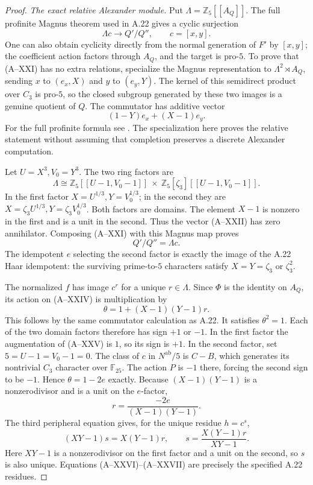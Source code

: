 \begin{proof}
\emph{The exact relative Alexander module.}
Put $\Lambda=\mathbb Z_5[[A_Q]]$. The full profinite
Magnus theorem used in A.22 gives a cyclic
surjection
\[
       \Lambda c\longrightarrow Q'/Q'',\qquad c=[x,y].          \tag{A--XXI}
\]
One can also obtain cyclicity directly from the
normal generation of $F'$ by $[x,y]$; the coefficient
action factors through $A_Q$, and the target is
pro-$5$. To prove that (A--XXI) has no extra
relations, specialize the Magnus representation
to $\Lambda^2\rtimes A_Q$, sending
$x$ to $(e_x,X)$ and $y$ to $(e_y,Y)$.
The kernel of this semidirect product over $C_3$
is pro-$5$, so the closed subgroup generated by
these two images is a genuine quotient of $Q$.
The commutator has additive vector
\[
                    (1-Y)e_x+(X-1)e_y.                          \tag{A--XXII}
\]
For the full profinite formula see
\citet[Propositions 3.2.1 and 4.1.1(b), Corollary 4.1.5]{A_ChenDeligne2017}.
The specialization here proves the relative
statement without assuming that completion
preserves a discrete Alexander computation.

Let $U=X^3,V_0=Y^3$. The two ring factors are
\[
 \Lambda\cong
 \mathbb Z_5[[U-1,V_0-1]]\ \times\
 \mathbb Z_5[\zeta_3][[U-1,V_0-1]].                            \tag{A--XXIII}
\]
In the first factor $X=U^{1/3},Y=V_0^{1/3}$;
in the second they are
$X=\zeta_3U^{1/3},Y=\zeta_3V_0^{1/3}$.
Both factors are domains. The element $X-1$
is nonzero in the first and is a unit in the
second. Thus the vector (A--XXII) has zero
annihilator. Composing (A--XXI) with this Magnus
map proves
\[
                         Q'/Q''=\Lambda c.                     \tag{A--XXIV}
\]
The idempotent $e$ selecting the second factor is
exactly the image of the A.22 Haar idempotent:
the surviving prime-to-$5$ characters satisfy
$X=Y=\zeta_3$ or $\zeta_3^2$.

The normalized $f$ has image $c^r$ for a unique
$r\in\Lambda$. Since $\Phi$ is the identity on
$A_Q$, its action on (A--XXIV) is multiplication by
\[
                 \theta=1+(X-1)(Y-1)r.                         \tag{A--XXV}
\]
This follows by the same commutator calculation
as A.22. It satisfies $\theta^2=1$. Each of the
two domain factors therefore has sign $+1$ or
$-1$. In the first factor the augmentation of
(A--XXV) is $1$, so its sign is $+1$.
In the second factor, set $5=U-1=V_0-1=0$.
The class of $c$ in $N^{\mathrm{ab}}/5$ is
$C-B$, which generates its nontrivial $C_3$
character over $\mathbb F_{25}$. The action $P$
is $-1$ there, forcing the second sign to be
$-1$. Hence $\theta=1-2e$ exactly.
Because $(X-1)(Y-1)$ is a nonzerodivisor and
is a unit on the $e$-factor,
\[
       r=\frac{-2e}{(X-1)(Y-1)}.                               \tag{A--XXVI}
\]
The third peripheral equation gives, for the
unique residue $h=c^s$,
\[
       (XY-1)s=X(Y-1)r,
       \qquad s=\frac{X(Y-1)r}{XY-1}.                          \tag{A--XXVII}
\]
Here $XY-1$ is a nonzerodivisor on the first
factor and a unit on the second, so $s$ is
also unique. Equations (A--XXVI)--(A--XXVII)
are precisely the specified A.22 residues.


\end{proof}

